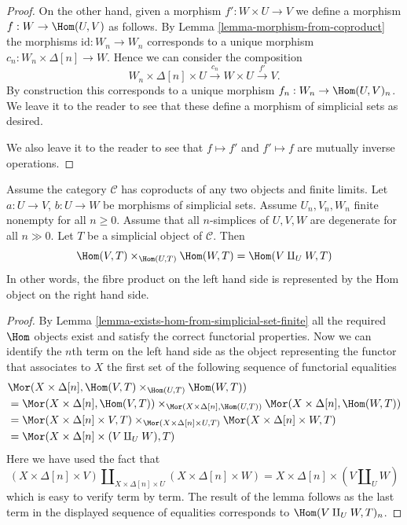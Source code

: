 \begin{proof}
\medskip\noindent
On the other hand, given a morphism
$f' : W \times U \to V$ we define
a morphism $f : W \to \Hom(U, V)$
as follows. By Lemma \ref{lemma-morphism-from-coproduct} the morphisms
$\text{id} : W_n \to W_n$ corresponds to a unique
morphism $c_n : W_n \times \Delta[n] \to W$.
Hence we can consider the composition
$$
W_n \times \Delta[n] \times U
\xrightarrow{c_n}
W \times U
\xrightarrow{f'}
V.
$$
By construction this corresponds to a unique morphism
$f_n : W_n \to \Hom(U, V)_n$. We leave it to the reader
to see that these define a morphism of simplicial sets as
desired.

\medskip\noindent
We also leave it to the reader to see that
$f \mapsto f'$ and $f' \mapsto f$ are mutually inverse
operations.
\end{proof}

\begin{lemma}
\label{lemma-hom-from-coprod}
Assume the category $\mathcal{C}$
has coproducts of any two objects and finite
limits. Let $a : U \to V$, $b : U \to W$
be morphisms of simplicial sets.
Assume $U_n, V_n, W_n$ finite nonempty for all $n \geq 0$.
Assume that all $n$-simplices of $U, V, W$
are degenerate for all $n \gg 0$.
Let $T$ be a simplicial object of $\mathcal{C}$.
Then
$$
\Hom(V, T) \times_{\Hom(U, T)} \Hom(W, T)
=
\Hom(V \amalg_U W, T)
$$
In other words, the fibre product on the left hand
side is represented by the Hom object on the right hand side.
\end{lemma}

\begin{proof}
By Lemma \ref{lemma-exists-hom-from-simplicial-set-finite}
all the required $\Hom$ objects exist and satisfy the
correct functorial properties. Now we can identify
the $n$th term on the left hand side as the object
representing the functor that associates to $X$
the first set of the following sequence of functorial
equalities
\begin{align*}
&
\Mor(X \times \Delta[n],
\Hom(V, T) \times_{\Hom(U, T)} \Hom(W, T)) \\
& =
\Mor(X \times \Delta[n], \Hom(V, T))
\times_{\Mor(X \times \Delta[n], \Hom(U, T))}
\Mor(X \times \Delta[n], \Hom(W, T)) \\
& =
\Mor(X \times \Delta[n] \times V, T)
\times_{\Mor(X \times \Delta[n] \times U, T)}
\Mor(X \times \Delta[n] \times W, T) \\
& =
\Mor(X \times \Delta[n] \times (V \amalg_U W), T)
\end{align*}
Here we have used the fact that
$$
(X \times \Delta[n] \times V)
\amalg_{X \times \Delta[n] \times U}
(X \times \Delta[n] \times W)
=
X \times \Delta[n] \times (V \amalg_U W)
$$
which is easy to verify term by term. The result of the lemma
follows as the last term in the displayed sequence of
equalities corresponds to $\Hom(V \amalg_U W, T)_n$.
\end{proof}














